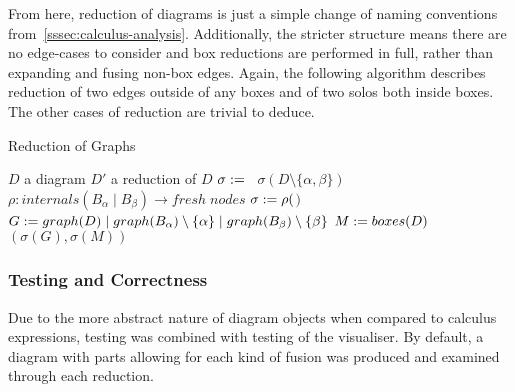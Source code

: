         From here, reduction of diagrams is just a simple change of naming conventions from~\ref{sssec:calculus-analysis}.
        Additionally, the stricter structure means there are no edge-cases to consider and box reductions are performed in full, rather than expanding and fusing non-box edges.
        Again, the following algorithm describes reduction of two edges outside of any boxes and of two solos both inside boxes.
        The other cases of reduction are trivial to deduce.

        \begin{breakablealgorithm}
            \caption{Reduction of Graphs}
            \begin{algorithmic}[1]
                \Require$D$ a diagram
                \Ensure$D'$ a reduction of $D$
                                \State$\sigma :=$~
                                \State\Return$\sigma(D \setminus \{\alpha, \beta\})$
                            \EndIf
                        \EndFor
                    \EndFor\\

                                \State$\rho : internals(B_{\alpha} \; | \; B_{\beta}) \rightarrow fresh\;nodes$
                                \State$\sigma := \rho($$)$
                                \State$G := graph(D) \; | \; graph(B_{\alpha}) \setminus \{\alpha\} \; | \; graph(B_{\beta}) \setminus \{\beta\}$
                                \State$M := boxes(D)$
                                \State\Return$(\sigma(G), \sigma(M))$
                            \EndIf
                        \EndFor
                    \EndFor
                \EndFunction
            \end{algorithmic}
        \end{breakablealgorithm}
        
    \subsubsection{Testing and Correctness}
        Due to the more abstract nature of diagram objects when compared to calculus expressions, testing was combined with testing of the visualiser.
        By default, a diagram with parts allowing for each kind of fusion was produced and examined through each reduction.
        

